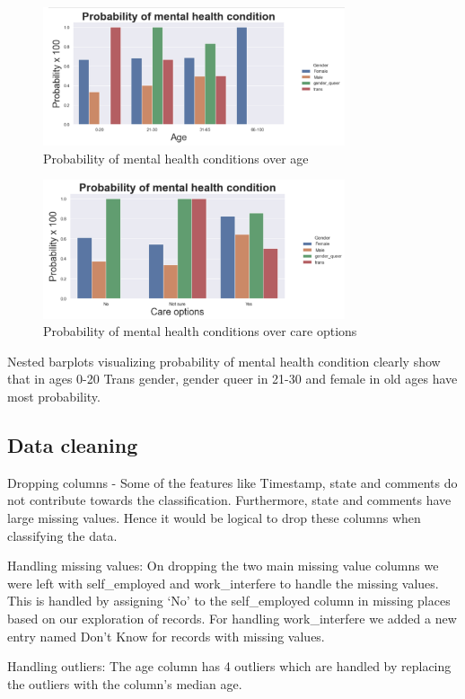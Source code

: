\documentclass[10pt,journal,compsoc]{IEEEtran}
\begin{document}
\begin{figure}[h]
\centering
\includegraphics[width=3.5in]{3.png}
\caption{Probability of mental health conditions over age}
\end{figure}

\begin{figure}[h]
\centering
\includegraphics[width=3.5in]{4.png}
\caption{Probability of mental health conditions over care options}
\end{figure}


\quad  Nested barplots visualizing probability of mental health condition clearly show that in ages 0-20 Trans gender, gender queer in 21-30 and female in old ages have most probability.


\subsection{Data cleaning}
Dropping columns - Some of the features like Timestamp, state and comments do not contribute towards the classification. Furthermore, state and comments have large missing values. Hence it would be logical to drop these columns when classifying the data.

\quad Handling missing values: On dropping the two main missing value columns we were left with self\_employed and work\_interfere to handle the missing values. This is handled by assigning ‘No’ to the self\_employed column in missing places based on our exploration of records. For handling work\_interfere we added a new entry named Don’t Know for records with missing values.

\quad Handling outliers: The age column has 4 outliers which are handled by replacing the outliers with the column's median age.
\end{document}
